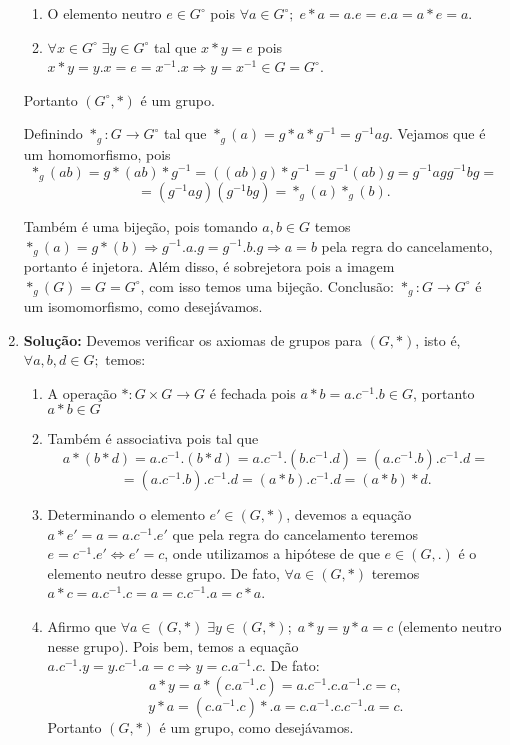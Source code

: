 \documentclass{article}
\begin{document}
\begin{enumerate}
\begin{enumerate}
			\item O elemento neutro $e \in G^{\circ}$ pois $\forall a \in G^{\circ}; \; e*a = a.e = e.a = a*e =a$.
			
			\item $\forall x \in G^{\circ} \; \exists y \in G^{\circ}$ tal que $x*y=e$ pois $x*y= y.x = e= x^{-1}.x \Rightarrow y = x^{-1} \in G = G^{\circ}$.
		\end{enumerate}
		Portanto $(G^{\circ}, *)$ é um grupo.
		
		Definindo $*_{g}:G\to G^{\circ}$ tal que $*_{g}(a) = g*a*g^{-1} = g^{-1}ag$. Vejamos que é um homomorfismo, pois 
		$$
		*_{g}(ab) = g*(ab)*g^{-1} = ((ab)g)*g^{-1} = g^{-1}(ab)g = g^{-1}agg^{-1}bg=
		$$ 
		$$
		= (g^{-1}ag)(g^{-1}bg) = *_{g}(a)*_{g}(b).
		$$
		
		Também é uma bijeção, pois tomando $a, b \in G$ temos $*_{g}(a) = g*(b) \Rightarrow g^{-1}.a.g = g^{-1}.b.g \Rightarrow a=b$ pela regra do cancelamento, portanto é injetora. Além disso, é sobrejetora pois a imagem $*_{g}(G) = G= G^{\circ}$, com isso temos uma bijeção. Conclusão: $*_{g}:G\to G^{\circ}$ é um isomomorfismo, como desejávamos.
		
		\item \textbf{Solução:} Devemos verificar os axiomas de grupos para $(G,*)$, isto é, $\forall a, b, d \in G; $ temos:
		\begin{enumerate}
			\item A operação $*: G \times G \to G$ é fechada pois $a*b = a.c^{-1}.b \in G$, portanto $a*b \in G$
			
			\item Também é associativa pois tal que 
			$$
			a*(b*d) = a.c^{-1}.(b*d) =  a.c^{-1}.(b.c^{-1}.d) = (a.c^{-1}.b).c^{-1}.d =
			$$
			$$
			= (a.c^{-1}.b).c^{-1}.d = (a*b).c^{-1}.d = (a*b)*d.
			$$
			
			\item Determinando o elemento $e' \in (G,*)$, devemos a equação $a*e' = a = a.c^{-1}.e'$ que pela regra do cancelamento teremos $e = c^{-1}.e' \iff e'=c$, onde utilizamos a hipótese de que $e \in (G,.)$ é o elemento neutro desse grupo. De fato, $\forall a \in (G,*)$ teremos $a*c = a.c^{-1}.c = a = c.c^{-1}.a = c*a$.
			
			\item Afirmo que $\forall a \in (G,*) \; \exists y \in (G,*); \; a*y = y*a = c$ (elemento neutro nesse grupo). Pois bem, temos a equação $a.c^{-1}.y = y.c^{-1}.a = c \Rightarrow y = c.a^{-1}.c$. De fato: 
			$$
			a*y = a*(c.a^{-1}.c) = a.c^{-1}.c.a^{-1}.c = c,
			$$
			$$
			y*a = (c.a^{-1}.c)*.a = c.a^{-1}.c.c^{-1}.a = c.
			$$
			Portanto $(G,*)$ é um grupo, como desejávamos.
		\end{enumerate}
		

\end{enumerate}
\end{document}
